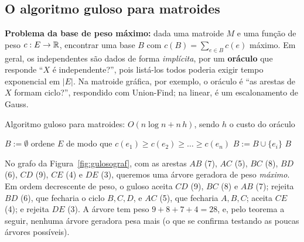 \subsection{O algoritmo guloso para matroides}
\textbf{Problema da base de peso máximo:} dada uma matroide $M$ e uma função de peso $c:E\to\mathbb{R}$, encontrar uma base $B$ com $c(B)=\sum_{e\in B}c(e)$ máximo. Em geral, os independentes são dados de forma \emph{implícita}, por um \textbf{oráculo} que responde ``$X$ é independente?'', pois listá-los todos poderia exigir tempo exponencial em $|E|$. Na matroide gráfica, por exemplo, o oráculo é ``as arestas de $X$ formam ciclo?'', respondido com Union-Find; na linear, é um escalonamento de Gauss.
\begin{pseudo}{Algoritmo guloso para matroides: $O(n\log n+n\,h)$, sendo $h$ o custo do oráculo}
\begin{algorithmic}
  \State $B:=\emptyset$
  \State ordene $E$ de modo que $c(e_1)\ge c(e_2)\ge\dots\ge c(e_n)$ 
     \State $B:=B\cup\{e_i\}$ \EndIf
  \EndFor
  \State \Return $B$
\EndFunction
\end{algorithmic}
\end{pseudo}

\begin{exemplo}\label{ex:gulosograf}
No grafo da Figura~\ref{fig:gulosograf}, com as arestas $AB$ (7), $AC$ (5), $BC$ (8), $BD$ (6), $CD$ (9), $CE$ (4) e $DE$ (3), queremos uma árvore geradora de peso \emph{máximo}. Em ordem decrescente de peso, o guloso aceita $CD$ (9), $BC$ (8) e $AB$ (7); rejeita $BD$ (6), que fecharia o ciclo $B,C,D$, e $AC$ (5), que fecharia $A,B,C$; aceita $CE$ (4); e rejeita $DE$ (3). A árvore tem peso $9+8+7+4=28$, e, pelo teorema a seguir, nenhuma árvore geradora pesa mais (o que se confirma testando as poucas árvores possíveis).
\begin{figura}
\end{figura}
\end{exemplo}


